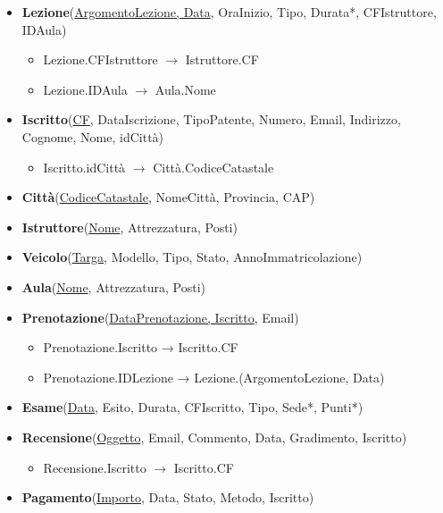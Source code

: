 \documentclass[10pt,twoside]{article}
\begin{document}
{{        \begin{itemize}
            \item \textbf{Lezione}(\underline{ArgomentoLezione, Data}, OraInizio, Tipo, Durata*, CFIstruttore, IDAula)
            \begin{itemize}
                \item Lezione.CFIstruttore  $\rightarrow$ Istruttore.CF
                \item Lezione.IDAula  $\rightarrow$ Aula.Nome
            \end{itemize}
            \item \textbf{Iscritto}(\underline{CF}, DataIscrizione, TipoPatente, Numero, Email, Indirizzo, Cognome, Nome, idCittà)
            \begin{itemize}
                \item Iscritto.idCittà $\rightarrow$ Città.CodiceCatastale
            \end{itemize}
            \item \textbf{Città}(\underline{CodiceCatastale}, NomeCittà, Provincia, CAP)
            \item \textbf{Istruttore}(\underline{Nome}, Attrezzatura, Posti)
            \item \textbf{Veicolo}(\underline{Targa}, Modello, Tipo, Stato, AnnoImmatricolazione)
            \item \textbf{Aula}(\underline{Nome}, Attrezzatura, Posti)
            \item \textbf{Prenotazione}(\underline{DataPrenotazione, Iscritto}, Email)
            \begin{itemize}
                \item Prenotazione.Iscritto → Iscritto.CF
                \item Prenotazione.IDLezione → Lezione.(ArgomentoLezione, Data)
            \end{itemize}
            \item \textbf{Esame}(\underline{Data}, Esito, Durata, CFIscritto, Tipo, Sede*, Punti*)
            \item \textbf{Recensione}(\underline{Oggetto}, Email, Commento, Data, Gradimento, Iscritto)
            \begin{itemize}
                \item Recensione.Iscritto $\rightarrow$ Iscritto.CF
            \end{itemize}
            \item \textbf{Pagamento}(\underline{Importo}, Data, Stato, Metodo, Iscritto)

\end{itemize}}}
\end{document}
